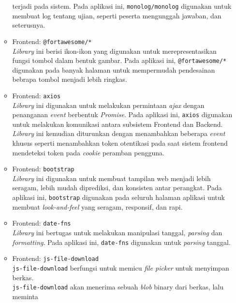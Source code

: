 \begin{itemize}
\begin{itemize}
                    terjadi pada sistem. Pada aplikasi ini, \texttt{monolog/monolog} digunakan untuk membuat log
                    tentang ujian, seperti peserta mengunggah jawaban, dan seterusnya.
                \item Frontend: \texttt{@fortawesome/*} \\
                    \textit{Library} ini berisi ikon-ikon yang digunakan untuk merepresentasikan fungsi
                    tombol dalam bentuk gambar. Pada aplikasi ini, \texttt{@fortawesome/*} digunakan pada
                    banyak halaman untuk mempermudah pendesainan bebrapa tombol menjadi lebih ringkas.
                \item Frontend: \texttt{axios} \\
                    \textit{Library} ini digunakan untuk melakukan permintaan \textit{ajax} dengan penanganan 
                    \textit{event} berbentuk \textit{Promise}. Pada aplikasi ini, \texttt{axios} digunakan untuk
                    melakukan komunikasi antara subsistem Frontend dan Backend. \textit{Library} ini kemudian
                    diturunkan dengan menambahkan beberapa \textit{event} khusus seperti menambahkan
                    token otentikasi pada saat sistem frontend mendeteksi token pada \textit{cookie}
                    peramban pengguna.
                \item Frontend: \texttt{bootstrap} \\
                    \textit{Library} ini digunakan untuk membuat tampilan web menjadi lebih seragam, lebih
                    mudah diprediksi, dan konsisten antar perangkat. Pada aplikasi ini, \texttt{bootstrap}
                    digunakan pada seluruh halaman aplikasi untuk membuat \textit{look-and-feel} yang seragam,
                    responsif, dan rapi.
                \item Frontend: \texttt{date-fns} \\
                    \textit{Library} ini bertugas untuk melakukan manipulasi tanggal, \textit{parsing} dan 
                    \textit{formatting}. Pada aplikasi ini, \texttt{date-fns} digunakan untuk \textit{parsing}
                    tanggal.
                \item Frontend: \texttt{js-file-download} \\
                    \texttt{js-file-download} berfungsi untuk memicu \textit{file picker} untuk menyimpan berkas.\\
                    \texttt{js-file-download} akan menerima sebuah \textit{blob} binary dari berkas, lalu meminta

\end{itemize}
\end{itemize}
